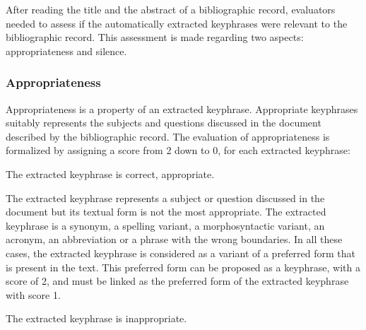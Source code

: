        After reading the title and the abstract of a bibliographic record, evaluators needed to assess if the automatically extracted keyphrases were relevant to the bibliographic record.
        This assessment is made regarding two aspects: appropriateness and silence.

        \subsubsection{Appropriateness}
        \label{subsubsec:appropriateness}
            Appropriateness is a property of an extracted keyphrase.
            Appropriate keyphrases suitably represents the subjects and questions discussed in the document described by the bibliographic record.
            The evaluation of appropriateness is formalized by assigning a score from 2 down to 0, for each extracted keyphrase:
            \begin{etaremune}[start=2]
                \item{
                    The extracted keyphrase is correct, appropriate.
                }
                \item{
                    The extracted keyphrase represents a subject or question discussed in the document but its textual form is not the most appropriate.
                    The extracted keyphrase is a synonym, a spelling variant, a morphosyntactic variant, an acronym, an abbreviation or a phrase with the wrong boundaries.
                    In all these cases, the extracted keyphrase is considered as a variant of a preferred form that is present in the text.
                    This preferred form can be proposed as a keyphrase, with a score of 2, and must be linked as the preferred form of the extracted keyphrase with score 1.
                }
                \item{
                    The extracted keyphrase is inappropriate.
                }
            \end{etaremune}
        
